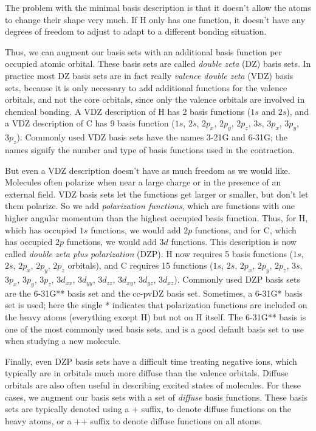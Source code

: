 The problem with the minimal basis description is that it doesn't
allow the atoms to change their shape very much. If H only has one
function, it doesn't have any degrees of freedom to adjust to adapt to
a different bonding situation. 

Thus, we can augment our basis sets with an additional basis function
per occupied atomic orbital. These basis sets are called \emph{double
zeta} (DZ) basis sets. In practice most DZ basis sets are in fact
really \emph{valence double zeta} (VDZ) basis sets, because it is only
necessary to add additional functions for the valence orbitals, and
not the core orbitals, since only the valence orbitals are involved in
chemical bonding. A VDZ description of H has 2 basis functions ($1s$
and $2s$), and a VDZ description of C has 9 basis function ($1s$,
$2s$, $2p_x$, $2p_y$, $2p_z$, $3s$, $3p_x$, $3p_y$, $3p_z$).  Commonly
used VDZ basis sets have the names 3-21G and 6-31G; the names signify
the number and type of basis functions used in the contraction.

But even a VDZ description doesn't have as much freedom as we would
like. Molecules often polarize when near a large charge or in the
presence of an external field. VDZ basis sets let the functions get
larger or smaller, but don't let them polarize. So we add
\emph{polarization functions}, which are functions with one higher
angular momentum than the highest occupied basis function. Thus, for
H, which has occupied $1s$ functions, we would add $2p$ functions, and
for C, which has occupied $2p$ functions, we would add $3d$
functions. This description is now called \emph{double zeta plus
polarization} (DZP). H now requires 5 basis functions ($1s$, $2s$,
$2p_x$, $2p_y$, $2p_z$ orbitals), and C requires 15 functions ($1s$,
$2s$, $2p_x$, $2p_y$, $2p_z$, $3s$, $3p_x$, $3p_y$, $3p_z$, $3d_{xx}$,
$3d_{yy}$, $3d_{zz}$, $3d_{xy}$, $3d_{yz}$, $3d_{xz}$). Commonly used
DZP basis sets are the 6-31G** basis set and the cc-pvDZ basis
set. Sometimes, a 6-31G* basis set is used; here the single *
indicates that polarization functions are included on the heavy atoms
(everything except H) but not on H itself. The 6-31G** basis is one of
the most commonly used basis sets, and is a good default basis set to
use when studying a new molecule.

Finally, even DZP basis sets have a difficult time treating negative
ions, which typically are in orbitals much more diffuse than the
valence orbitals. Diffuse orbitals are also often useful in describing
excited states of molecules. For these cases, we augment our basis
sets with a set of \emph{diffuse} basis functions. These basis sets
are typically denoted using a + suffix, to denote diffuse functions
on the heavy atoms, or a ++ suffix to denote diffuse functions on all
atoms. 


